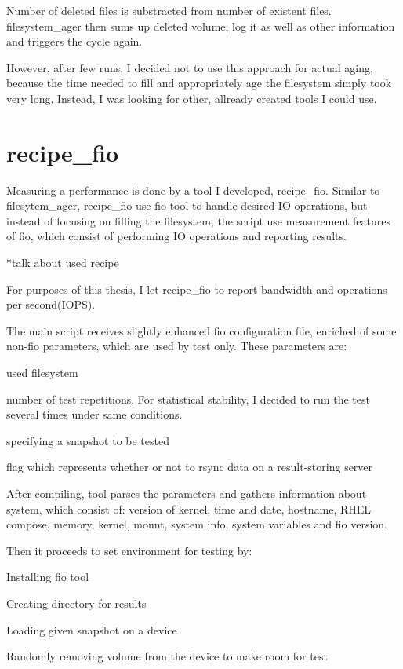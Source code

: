 \documentclass[
  color, %
  table, %
  lof,   %
  lot,   %
]{fithesis3}
\begin{document}
Number of deleted files is substracted from number of existent files.
filesystem\_ager then sums up deleted volume, log it as well as other information and triggers the cycle again.

However, after few runs, I decided not to use this approach for actual aging, because the time needed to fill and appropriately age the filesystem simply took very long. Instead, I was looking for other, allready created tools I could use.


\section{recipe\_fio}
Measuring a performance is done by a tool I developed, recipe\_fio. Similar to filesytem\_ager, recipe\_fio use fio tool to handle desired IO operations, but instead of focusing on filling the filesystem, the script use measurement features of fio, which consist of performing IO operations and reporting results.

*talk about used recipe

For purposes of this thesis, I let recipe\_fio to report bandwidth and operations per second(IOPS).

The main script receives slightly enhanced fio configuration file, enriched of some non-fio parameters, which are used by test only. These parameters are:
\begin{compactenum}
  \item used filesystem
  \item number of test repetitions. For statistical stability, I decided to run the test several times under same conditions.
  \item specifying a snapshot to be tested
  \item flag which represents whether or not to rsync data on a result-storing server
  \end{compactenum}

After compiling, tool parses the parameters and gathers information about system, which consist of: version of kernel, time and date, hostname, RHEL compose, memory, kernel, mount, system info, system variables and fio version.

Then it proceeds to set environment for testing by:

\begin{compactenum}
  \item Installing fio tool
  \item Creating directory for results
  \item Loading given snapshot on a device
  \item Randomly removing volume from the device to make room for test
\end{compactenum}
\end{document}
